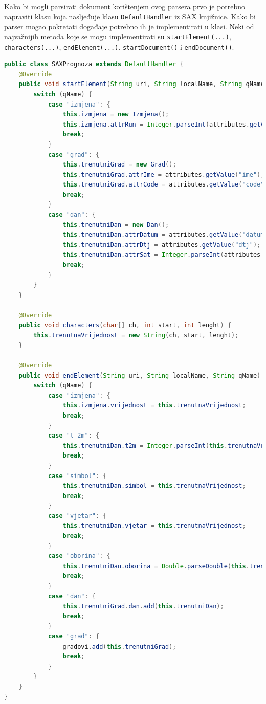 \documentclass{foi}
\begin{document}
Kako bi mogli parsirati dokument korištenjem ovog parsera prvo je potrebno napraviti
klasu koja nasljeđuje klasu \texttt{DefaultHandler} iz SAX knjižnice. Kako bi parser
mogao pokretati događaje potrebno ih je implementirati u klasi. Neki od najvažnijih
metoda koje se mogu implementirati su \texttt{startElement(...)}, \texttt{characters(...)},
\texttt{endElement(...)}. \texttt{startDocument()} i \texttt{endDocument()}.

\begin{lstlisting}[language=java, caption={Primjer implementacije metoda za prihvačanje događaja}]
public class SAXPrognoza extends DefaultHandler {
    @Override
    public void startElement(String uri, String localName, String qName, Attributes attributes) {
        switch (qName) {
            case "izmjena": {
                this.izmjena = new Izmjena();
                this.izmjena.attrRun = Integer.parseInt(attributes.getValue("run"));
                break;
            }
            case "grad": {
                this.trenutniGrad = new Grad();
                this.trenutniGrad.attrIme = attributes.getValue("ime");
                this.trenutniGrad.attrCode = attributes.getValue("code");
                break;
            }
            case "dan": {
                this.trenutniDan = new Dan();
                this.trenutniDan.attrDatum = attributes.getValue("datum");
                this.trenutniDan.attrDtj = attributes.getValue("dtj");
                this.trenutniDan.attrSat = Integer.parseInt(attributes.getValue("sat"));
                break;
            }
        }
    }

    @Override
    public void characters(char[] ch, int start, int lenght) {
        this.trenutnaVrijednost = new String(ch, start, lenght);
    }

    @Override
    public void endElement(String uri, String localName, String qName) {
        switch (qName) {
            case "izmjena": {
                this.izmjena.vrijednost = this.trenutnaVrijednost;
                break;
            }
            case "t_2m": {
                this.trenutniDan.t2m = Integer.parseInt(this.trenutnaVrijednost);
                break;
            }
            case "simbol": {
                this.trenutniDan.simbol = this.trenutnaVrijednost;
                break;
            }
            case "vjetar": {
                this.trenutniDan.vjetar = this.trenutnaVrijednost;
                break;
            }
            case "oborina": {
                this.trenutniDan.oborina = Double.parseDouble(this.trenutnaVrijednost);
                break;
            }
            case "dan": {
                this.trenutniGrad.dan.add(this.trenutniDan);
                break;
            }
            case "grad": {
                gradovi.add(this.trenutniGrad);
                break;
            }
        }
    }
}
\end{lstlisting}
\end{document}

